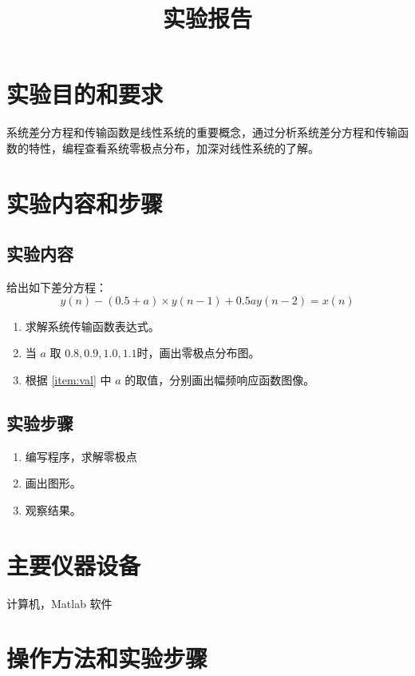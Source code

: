 \documentclass{zjureport}
\title{实验报告}
\date{\zhtoday}
\begin{document}
\makecover
\makeheader


\section{实验目的和要求}
  系统差分方程和传输函数是线性系统的重要概念，通过分析系统差分方程和传输函数的特性，编程查看系统零极点分布，加深对线性系统的了解。
\section{实验内容和步骤}

  \subsection{实验内容}

      给出如下差分方程：
      $$y(n) - (0.5+a)\times y(n-1) + 0.5ay(n-2) = x(n)$$
      \begin{enumerate}
          \item 求解系统传输函数表达式。
          \item 当 $a$ 取 $0.8, 0.9, 1.0, 1.1$时，画出零极点分布图。
                \label{item:val}
          \item 根据 \ref{item:val} 中 $a$ 的取值，分别画出幅频响应函数图像。
      \end{enumerate}

  \subsection{实验步骤}
      \begin{enumerate}
          \item 编写程序，求解零极点
          \item 画出图形。
          \item 观察结果。
      \end{enumerate}

\section{主要仪器设备}
  计算机，Matlab 软件

\section{操作方法和实验步骤}
\end{document}
